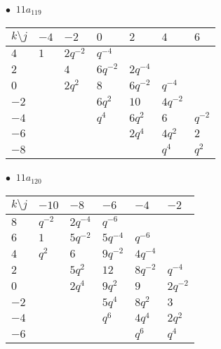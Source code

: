 \begin{minipage}{\linewidth}
$\bullet\ $ $11a_{119}$ \vspace{0.5em} \\
\begin{tabular}{l|llllll}
$k \setminus j$ & $-4$ & $-2$ & $0$ & $2$ & $4$ & $6$ \\
\hline
$4$ & $1$ & $2q^{-2}$ & $q^{-4}$ &  &  &  \\
$2$ &  & $4$ & $6q^{-2}$ & $2q^{-4}$ &  &  \\
$0$ &  & $2q^{2}$ & $8$ & $6q^{-2}$ & $q^{-4}$ &  \\
$-2$ &  &  & $6q^{2}$ & $10$ & $4q^{-2}$ &  \\
$-4$ &  &  & $q^{4}$ & $6q^{2}$ & $6$ & $q^{-2}$ \\
$-6$ &  &  &  & $2q^{4}$ & $4q^{2}$ & $2$ \\
$-8$ &  &  &  &  & $q^{4}$ & $q^{2}$ \\
\end{tabular}
\vspace{2em}
\end{minipage}
%
\begin{minipage}{\linewidth}
$\bullet\ $ $11a_{120}$ \vspace{0.5em} \\
\begin{tabular}{l|lllll}
$k \setminus j$ & $-10$ & $-8$ & $-6$ & $-4$ & $-2$ \\
\hline
$8$ & $q^{-2}$ & $2q^{-4}$ & $q^{-6}$ &  &  \\
$6$ & $1$ & $5q^{-2}$ & $5q^{-4}$ & $q^{-6}$ &  \\
$4$ & $q^{2}$ & $6$ & $9q^{-2}$ & $4q^{-4}$ &  \\
$2$ &  & $5q^{2}$ & $12$ & $8q^{-2}$ & $q^{-4}$ \\
$0$ &  & $2q^{4}$ & $9q^{2}$ & $9$ & $2q^{-2}$ \\
$-2$ &  &  & $5q^{4}$ & $8q^{2}$ & $3$ \\
$-4$ &  &  & $q^{6}$ & $4q^{4}$ & $2q^{2}$ \\
$-6$ &  &  &  & $q^{6}$ & $q^{4}$ \\
\end{tabular}
\vspace{2em}
\end{minipage}
%
